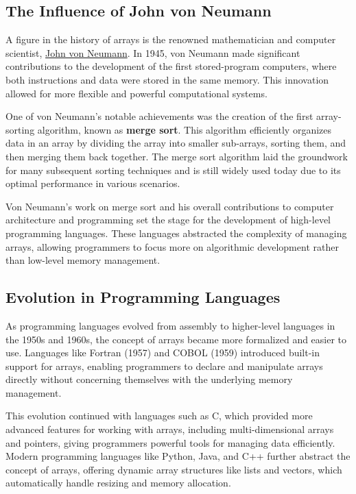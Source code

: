 \documentclass{book}
\begin{document}
	\subsection{The Influence of John von Neumann}
	
	A figure in the history of arrays is the renowned mathematician and computer scientist, \href{https://en.wikipedia.org/wiki/John_von_Neumann#Computer_science}{John von Neumann}. In 1945, von Neumann made significant contributions to the development of the first stored-program computers, where both instructions and data were stored in the same memory. This innovation allowed for more flexible and powerful computational systems.
	
	One of von Neumann's notable achievements was the creation of the first array-sorting algorithm, known as \textbf{merge sort}. This algorithm efficiently organizes data in an array by dividing the array into smaller sub-arrays, sorting them, and then merging them back together. The merge sort algorithm laid the groundwork for many subsequent sorting techniques and is still widely used today due to its optimal performance in various scenarios.
	
	Von Neumann’s work on merge sort and his overall contributions to computer architecture and programming set the stage for the development of high-level programming languages. These languages abstracted the complexity of managing arrays, allowing programmers to focus more on algorithmic development rather than low-level memory management.
	
	\subsection{Evolution in Programming Languages}
	
	As programming languages evolved from assembly to higher-level languages in the 1950s and 1960s, the concept of arrays became more formalized and easier to use. Languages like Fortran (1957) and COBOL (1959) introduced built-in support for arrays, enabling programmers to declare and manipulate arrays directly without concerning themselves with the underlying memory management.
	
	This evolution continued with languages such as C, which provided more advanced features for working with arrays, including multi-dimensional arrays and pointers, giving programmers powerful tools for managing data efficiently. Modern programming languages like Python, Java, and C++ further abstract the concept of arrays, offering dynamic array structures like lists and vectors, which automatically handle resizing and memory allocation.
	
\end{document}
